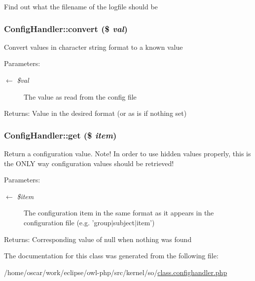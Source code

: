 Find out what the filename of the logfile should be \hypertarget{classConfigHandler_df3dd923bfd38e0274dc86ebd0caed92}{
\subsubsection{\setlength{\rightskip}{0pt plus 5cm}ConfigHandler::convert (\$ {\em val})}}
\label{classConfigHandler_df3dd923bfd38e0274dc86ebd0caed92}


Convert values in character string format to a known value

\begin{Desc}
\item[Parameters:]
\begin{description}
\item[\mbox{$\leftarrow$} {\em \$val}]The value as read from the config file \end{description}
\end{Desc}
\begin{Desc}
\item[Returns:]Value in the desired format (or as is if nothing set) \end{Desc}
\hypertarget{classConfigHandler_e55c0b4508da28ff46299bb7111435cf}{
\subsubsection{\setlength{\rightskip}{0pt plus 5cm}ConfigHandler::get (\$ {\em item})}}
\label{classConfigHandler_e55c0b4508da28ff46299bb7111435cf}


Return a configuration value. Note! In order to use hidden values properly, this is the ONLY way configuration values should be retrieved!

\begin{Desc}
\item[Parameters:]
\begin{description}
\item[\mbox{$\leftarrow$} {\em \$item}]The configuration item in the same format as it appears in the configuration file (e.g. 'group$|$subject$|$item') \end{description}
\end{Desc}
\begin{Desc}
\item[Returns:]Corresponding value of null when nothing was found \end{Desc}


The documentation for this class was generated from the following file:\begin{CompactItemize}
\item 
/home/oscar/work/eclipse/owl-php/src/kernel/so/\hyperlink{class_8confighandler_8php}{class.confighandler.php}\end{CompactItemize}
